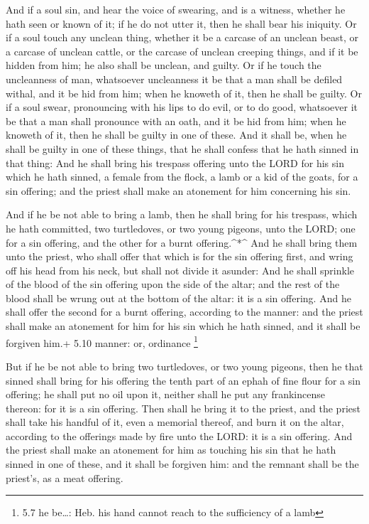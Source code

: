  And if a soul sin, and hear the voice of swearing, and is a
witness, whether he hath seen or known of it; if he do not utter it,
then he shall bear his iniquity.  Or if a soul touch any
unclean thing, whether it be a carcase of an unclean beast, or a carcase
of unclean cattle, or the carcase of unclean creeping things, and if it
be hidden from him; he also shall be unclean, and guilty. 
Or if he touch the uncleanness of man, whatsoever uncleanness it be that
a man shall be defiled withal, and it be hid from him; when he knoweth
of it, then he shall be guilty.  Or if a soul swear,
pronouncing with his lips to do evil, or to do good, whatsoever it be
that a man shall pronounce with an oath, and it be hid from him; when he
knoweth of it, then he shall be guilty in one of these.  And
it shall be, when he shall be guilty in one of these things, that he
shall confess that he hath sinned in that thing:  And he
shall bring his trespass offering unto the LORD for his sin which he
hath sinned, a female from the flock, a lamb or a kid of the goats, for
a sin offering; and the priest shall make an atonement for him
concerning his sin.

 And if he be not able to bring a lamb, then he shall bring
for his trespass, which he hath committed, two turtledoves, or two young
pigeons, unto the LORD; one for a sin offering, and the other for a
burnt offering.\^{}*\^{}  And he shall bring them unto the
priest, who shall offer that which is for the sin offering first, and
wring off his head from his neck, but shall not divide it asunder:
 And he shall sprinkle of the blood of the sin offering upon
the side of the altar; and the rest of the blood shall be wrung out at
the bottom of the altar: it is a sin offering.  And he
shall offer the second for a burnt offering, according to the manner:
and the priest shall make an atonement for him for his sin which he hath
sinned, and it shall be forgiven him.+ 5.10 manner: or, ordinance
\footnote{5.7 he be\ldots: Heb. his hand cannot reach to the sufficiency
  of a lamb}

 But if he be not able to bring two turtledoves, or two
young pigeons, then he that sinned shall bring for his offering the
tenth part of an ephah of fine flour for a sin offering; he shall put no
oil upon it, neither shall he put any frankincense thereon: for it is a
sin offering.  Then shall he bring it to the priest, and
the priest shall take his handful of it, even a memorial thereof, and
burn it on the altar, according to the offerings made by fire unto the
LORD: it is a sin offering.  And the priest shall make an
atonement for him as touching his sin that he hath sinned in one of
these, and it shall be forgiven him: and the remnant shall be the
priest's, as a meat offering.

